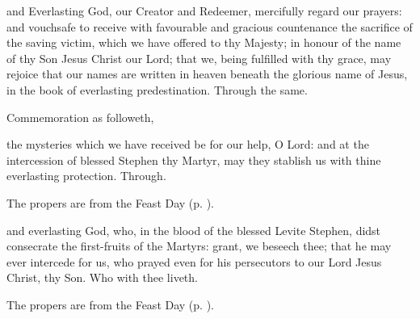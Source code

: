 
\postcommunion
{} and Everlasting God, our Creator and Redeemer, mercifully regard our prayers: and vouchsafe to receive with favourable and gracious countenance the sacrifice of the saving victim, which we have offered to thy Majesty; in honour of the name of thy Son Jesus Christ our Lord; that we, being fulfilled with thy grace, may rejoice that our names are written in heaven beneath the glorious name of Jesus, in the book of everlasting predestination. Through the same.
\begin{rubric}
	Commemoration  as followeth,
\end{rubric}
 the mysteries which we have received be for our help, O Lord: and at the intercession of blessed Stephen thy Martyr, may they stablish us with thine everlasting protection. Through.


\clearpage
{}

\begin{rubric}
	The propers are from the Feast Day (p. \pageref{SaintStephen}).
\end{rubric}

\vspace{-0.25\baselineskip}

\collect

\vspace{-0.1\baselineskip}

 and everlasting God, who, in the blood of the blessed Levite Stephen, didst consecrate the first-fruits of the Martyrs: grant, we beseech thee; that he may ever intercede for us, who prayed even for his persecutors to our Lord Jesus Christ, thy Son. Who with thee liveth.



\begin{rubric}
	The propers are from the Feast Day (p. \pageref{SaintJohn}).
\end{rubric}

\vspace{-0.25\baselineskip}

